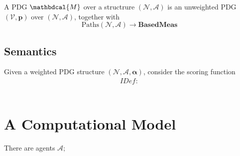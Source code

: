 \documentclass[twoside]{article} %
\theoremstyle{plain}
\theoremstyle{definition}
\newcommand{\BaseMeas}{\mathbf{BasedMeas}}
\newcommand{\mat}[1]{\mathbf{#1}}
\newcommand{\V}{\mathcal V}
\newcommand{\N}{\mathcal N}
\newcommand{\Ar}{\mathcal A}
\newcommand{\balpha}{\boldsymbol\alpha}
\newcommand{\dg}[1]{\mathbdcal{#1}}
\newcommand{\IDef}[1]{\mathit{IDef}_{\!#1}}
\begin{document}
    
    \begin{defn}[PDG]
        A PDG $\dg M$ over a structrure $(\N, \Ar)$ is an unweighted PDG $(\V, \mat p)$ over $(\N, \Ar)$, together with 
        \[ 
            \mathrm{Paths}(\N, \Ar) \to \BaseMeas
        \]
    \end{defn}
    
    
    \subsection{Semantics}
    Given a weighted PDG structure $(\N, \Ar, \balpha)$, consider the scoring function 
    \begin{align*}
        \IDef{} : 
    \end{align*}
    
    
    
    \[ \] 

    
    
    \section{A Computational Model}
    There are agents $\mathcal A$; 
    \begin{center}
        \begin{tikzpicture}
            
        \end{tikzpicture}
    \end{center}
    
    
\end{document}

